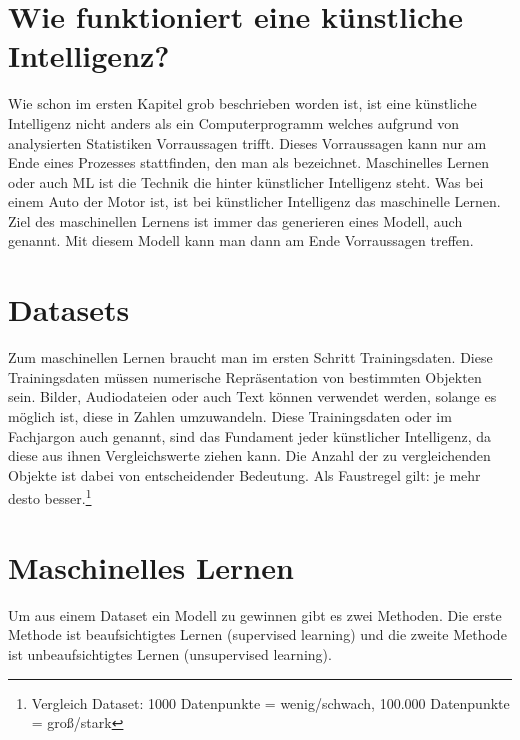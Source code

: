 \documentclass[a4paper,12pt,german,ngerman]{report}
\begin{document}
    \section{Wie funktioniert eine künstliche Intelligenz?}
        Wie schon im ersten Kapitel grob beschrieben worden ist, ist eine künstliche Intelligenz nicht anders als ein
        Computerprogramm welches aufgrund von analysierten Statistiken Vorraussagen trifft. Dieses Vorraussagen kann
        nur am Ende eines Prozesses stattfinden, den man als  bezeichnet. Maschinelles Lernen
        oder auch ML ist die Technik die hinter künstlicher Intelligenz steht. Was bei einem Auto der Motor ist,
        ist bei künstlicher Intelligenz das maschinelle Lernen. Ziel des maschinellen Lernens ist immer das generieren
        eines Modell, auch  genannt. Mit diesem Modell kann man dann am Ende Vorraussagen treffen.

    \section{Datasets}
        Zum maschinellen Lernen braucht man im ersten Schritt Trainingsdaten. Diese Trainingsdaten müssen numerische
        Repräsentation von bestimmten Objekten sein. Bilder, Audiodateien oder auch Text können verwendet werden,
        solange es möglich ist, diese in Zahlen umzuwandeln. Diese Trainingsdaten oder im Fachjargon auch 
        genannt, sind das Fundament jeder künstlicher Intelligenz, da diese aus ihnen Vergleichswerte ziehen kann. Die Anzahl
        der zu vergleichenden Objekte ist dabei von entscheidender Bedeutung. Als Faustregel gilt: je mehr desto besser.\footnote{Vergleich Dataset: 1000 Datenpunkte = wenig/schwach, 100.000 Datenpunkte = groß/stark}

    \section{Maschinelles Lernen}
        Um aus einem Dataset ein Modell zu gewinnen gibt es zwei Methoden. Die erste Methode ist beaufsichtigtes Lernen (supervised learning) und
        die zweite Methode ist unbeaufsichtigtes Lernen (unsupervised learning).
\end{document}
